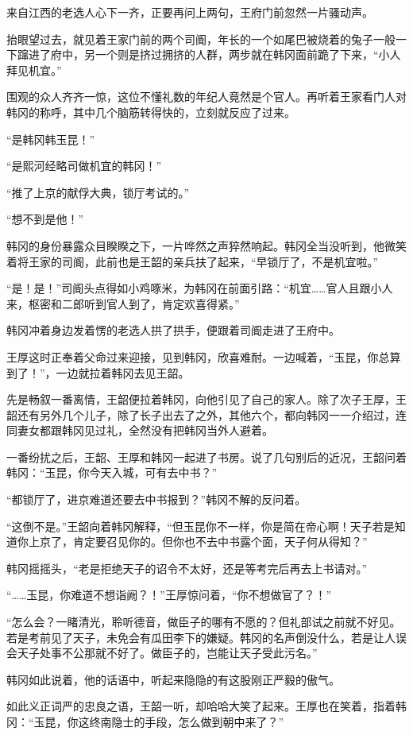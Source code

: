 来自江西的老选人心下一齐，正要再问上两句，王府门前忽然一片骚动声。

抬眼望过去，就见着王家门前的两个司阍，年长的一个如尾巴被烧着的兔子一般一下蹿进了府中，另一个则是挤过拥挤的人群，两步就在韩冈面前跪了下来，“小人拜见机宜。”

围观的众人齐齐一惊，这位不懂礼数的年纪人竟然是个官人。再听着王家看门人对韩冈的称呼，其中几个脑筋转得快的，立刻就反应了过来。

“是韩冈韩玉昆！”

“是熙河经略司做机宜的韩冈！”

“推了上京的献俘大典，锁厅考试的。”

“想不到是他！”

韩冈的身份暴露众目睽睽之下，一片哗然之声猝然响起。韩冈全当没听到，他微笑着将王家的司阍，此前也是王韶的亲兵扶了起来，“早锁厅了，不是机宜啦。”

“是！是！”司阍头点得如小鸡啄米，为韩冈在前面引路：“机宜……官人且跟小人来，枢密和二郎听到官人到了，肯定欢喜得紧。”

韩冈冲着身边发着愣的老选人拱了拱手，便跟着司阍走进了王府中。

王厚这时正奉着父命过来迎接，见到韩冈，欣喜难耐。一边喊着，“玉昆，你总算到了！”，一边就拉着韩冈去见王韶。

先是畅叙一番离情，王韶便拉着韩冈，向他引见了自己的家人。除了次子王厚，王韶还有另外几个儿子，除了长子出去了之外，其他六个，都向韩冈一一介绍过，连同妻女都跟韩冈见过礼，全然没有把韩冈当外人避着。

一番纷扰之后，王韶、王厚和韩冈一起进了书房。说了几句别后的近况，王韶问着韩冈：“玉昆，你今天入城，可有去中书？”

“都锁厅了，进京难道还要去中书报到？”韩冈不解的反问着。

“这倒不是。”王韶向着韩冈解释，“但玉昆你不一样，你是简在帝心啊！天子若是知道你上京了，肯定要召见你的。但你也不去中书露个面，天子何从得知？”

韩冈摇摇头，“老是拒绝天子的诏令不太好，还是等考完后再去上书请对。”

“……玉昆，你难道不想诣阙？！”王厚惊问着，“你不想做官了？！”

“怎么会？一睹清光，聆听德音，做臣子的哪有不愿的？但礼部试之前就不好见。若是考前见了天子，未免会有瓜田李下的嫌疑。韩冈的名声倒没什么，若是让人误会天子处事不公那就不好了。做臣子的，岂能让天子受此污名。”

韩冈如此说着，他的话语中，听起来隐隐的有这股刚正严毅的傲气。

如此义正词严的忠良之语，王韶一听，却哈哈大笑了起来。王厚也在笑着，指着韩冈：“玉昆，你这终南隐士的手段，怎么做到朝中来了？”


